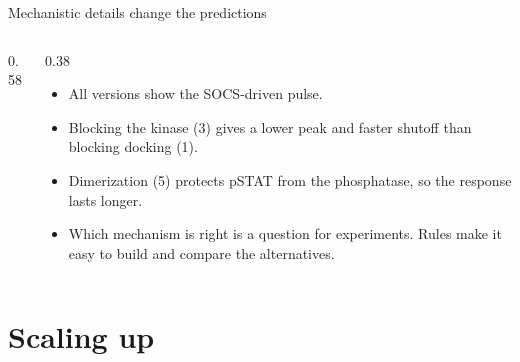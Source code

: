 \documentclass[aspectratio=169,10pt,t]{beamer}
\begin{document}
\begin{frame}{Mechanistic details change the predictions}
  \begin{columns}[c]
    \begin{column}{0.58\textwidth}
    \end{column}
    \begin{column}{0.38\textwidth}
      \small
      \begin{itemize}
        \setlength\itemsep{1.5mm}
        \item<5-> All versions show the SOCS-driven pulse.
        \item<6-> Blocking the kinase (3) gives a lower peak and faster shutoff than
              blocking docking (1).
        \item<7-> Dimerization (5) protects pSTAT from the phosphatase, so the response lasts
              longer.
        \item<8-> Which mechanism is right is a question for experiments. Rules make it easy
              to build and compare the alternatives.
      \end{itemize}
    \end{column}
  \end{columns}
\end{frame}

\section{Scaling up}
\end{document}
